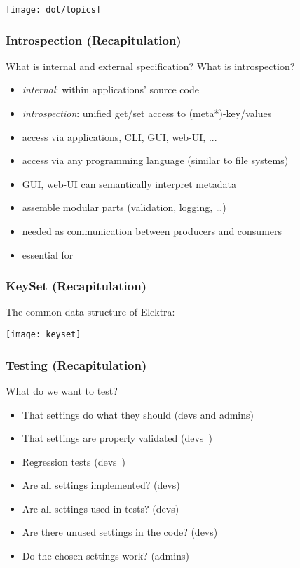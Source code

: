 \begin{frame}
	\hspace*{-1cm}\texttt{[image: dot/topics]}
\end{frame}

\begin{frame}
	\frametitle{Introspection (Recapitulation)}
	\begin{task}
	What is internal and external specification?
	What is introspection?
	\end{task}

	\pause
	\vspace{1em}

	\begin{itemize}
	\item \textit{internal}: within applications' source code
	\item \textit{introspection}: unified get/set access to (meta*)-key/values
	\item access via applications, CLI, GUI, web-UI, ...
	\item access via any programming language (similar to file systems)
	\item GUI, web-UI can semantically interpret metadata
	\item assemble modular parts (validation, logging, \dots)
	\item needed as communication between producers and consumers
	\item essential for ~\citet{holland2001nofutz}
	\end{itemize}
\end{frame}

\begin{frame}
	\frametitle{KeySet (Recapitulation)}

	The common data structure of Elektra:
	\vspace{1cm}

	\texttt{[image: keyset]}
\end{frame}

\begin{frame}
	\frametitle{Testing (Recapitulation)}
	\begin{task}
	What do we want to test?
	\end{task}

	\pause

	\begin{itemize}
	\item That settings do what they should (devs and admins)
	\item That settings are properly validated (devs~\cite{xu2013blame})
	\item Regression tests (devs~\cite{qu2008configuration})
	\vspace{1em}
	\item Are all settings implemented? (devs)
	\item Are all settings used in tests? (devs)
	\item Are there unused settings in the code? (devs)
	\item Do the chosen settings work? (admins)
	\end{itemize}
\end{frame}

